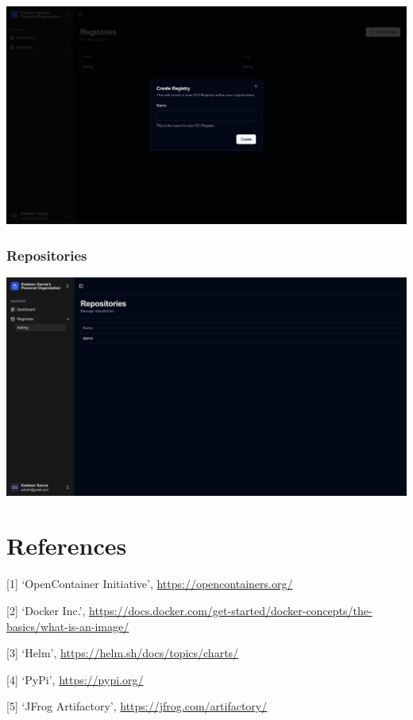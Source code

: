 \documentclass{article}
\begin{document}
  \includegraphics[scale=0.28]{screenshots/create-registry.png}

  \subsubsection{Repositories}

  \includegraphics[scale=0.28]{screenshots/repositories.png}

  \newpage

  \section{References}

  [1] `OpenContainer Initiative', \url{https://opencontainers.org/}
  
  [2] `Docker Inc.', \url{https://docs.docker.com/get-started/docker-concepts/the-basics/what-is-an-image/}

  [3] `Helm', \url{https://helm.sh/docs/topics/charts/}

  [4] `PyPi', \url{https://pypi.org/}

  [5] `JFrog Artifactory', \url{https://jfrog.com/artifactory/}
\end{document}

